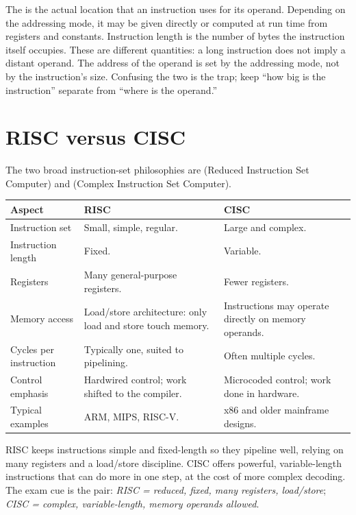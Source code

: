 The  is the actual location that an instruction uses
for its operand. Depending on the addressing mode, it may be given directly
or computed at run time from registers and constants. Instruction length is
the number of bytes the instruction itself occupies. These are different
quantities: a long instruction does not imply a distant operand. The address
of the operand is set by the addressing mode, not by the instruction's size.
Confusing the two is the trap; keep ``how big is the instruction'' separate
from ``where is the operand.''

\section{RISC versus CISC}
The two broad instruction-set philosophies are  (Reduced Instruction
Set Computer) and  (Complex Instruction Set Computer).

\begin{center}
\begin{tabular}{p{}p{}p{}}
\toprule
\textbf{Aspect} & \textbf{RISC} & \textbf{CISC} \\
\midrule
Instruction set & Small, simple, regular. & Large and complex. \\
Instruction length & Fixed. & Variable. \\
Registers & Many general-purpose registers. & Fewer registers. \\
Memory access & Load/store architecture: only load and store touch memory. & Instructions may operate directly on memory operands. \\
Cycles per instruction & Typically one, suited to pipelining. & Often multiple cycles. \\
Control emphasis & Hardwired control; work shifted to the compiler. & Microcoded control; work done in hardware. \\
Typical examples & ARM, MIPS, RISC-V. & x86 and older mainframe designs. \\
\bottomrule
\end{tabular}
\end{center}

RISC keeps instructions simple and fixed-length so they pipeline well, relying
on many registers and a load/store discipline. CISC offers powerful,
variable-length instructions that can do more in one step, at the cost of
more complex decoding. The exam cue is the pair: \emph{RISC = reduced, fixed,
many registers, load/store}; \emph{CISC = complex, variable-length, memory
operands allowed}.

